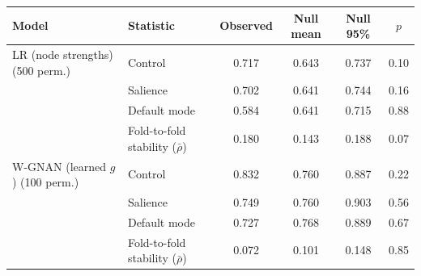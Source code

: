\begin{tabular}{llcccc}
\toprule
Model & Statistic & Observed & Null mean & Null 95\% & $p$ \\
\midrule
LR (node strengths) (500 perm.) & Control & 0.717 & 0.643 & 0.737 & 0.10 \\
 & Salience & 0.702 & 0.641 & 0.744 & 0.16 \\
 & Default mode & 0.584 & 0.641 & 0.715 & 0.88 \\
 & Fold-to-fold stability ($\bar\rho$) & 0.180 & 0.143 & 0.188 & 0.07 \\
\midrule
W-GNAN (learned $g$) (100 perm.) & Control & 0.832 & 0.760 & 0.887 & 0.22 \\
 & Salience & 0.749 & 0.760 & 0.903 & 0.56 \\
 & Default mode & 0.727 & 0.768 & 0.889 & 0.67 \\
 & Fold-to-fold stability ($\bar\rho$) & 0.072 & 0.101 & 0.148 & 0.85 \\
\bottomrule
\end{tabular}

